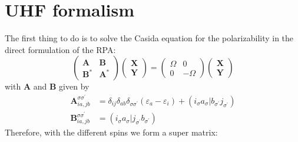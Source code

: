 \section{UHF formalism}
The first thing to do is to solve the Casida equation for the polarizability in the direct formulation of the RPA:
\begin{equation}\label{eq:kptsCasida}
	\begin{pmatrix}
        \mathbf{A}  & \mathbf{B} \\
        \mathbf{B}^{*} & \mathbf{A}^{*}
    \end{pmatrix}
    \begin{pmatrix}
        \mathbf{X} \\
        \mathbf{Y}
    \end{pmatrix}
    =
    \begin{pmatrix}
        \Omega & 0 \\
        0 & -\Omega
    \end{pmatrix}
    \begin{pmatrix}
        \mathbf{X} \\
        \mathbf{Y}
    \end{pmatrix}
\end{equation}
with $\mathbf{A}$ and $\mathbf{B}$ given by
    \begin{align}\nonumber
    \mathbf{A}_{ia, jb}^{\sigma \sigma ^{\prime}} &= \delta_{ij}\delta_{ab}\delta_{\sigma \sigma ^{\prime}}(\varepsilon_a - \varepsilon_i) + (i_{\sigma}a_{\sigma}|b_{\sigma ^{\prime}}j_{\sigma ^{\prime}}) \\
    \mathbf{B}_{ia, jb}^{\sigma \sigma ^{\prime}} &= (i_{\sigma}a_{\sigma}|j_{\sigma ^{\prime}}b_{\sigma ^{\prime}})
\end{align}
Therefore, with the different spins we form a super matrix:
